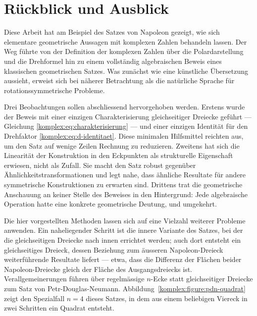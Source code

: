 %
%
\section{Rückblick und Ausblick
\label{komplex:section:rueckblick}}
Diese Arbeit hat am Beispiel des Satzes von Napoleon gezeigt,
wie sich elementare geometrische Aussagen mit komplexen Zahlen behandeln
lassen.
Der Weg führte von der Definition der komplexen Zahlen über die
Polardarstellung und die Drehformel hin zu einem vollständig algebraischen
Beweis eines klassischen geometrischen Satzes.
Was zunächst wie eine künstliche Übersetzung aussieht,
erweist sich bei näherer Betrachtung als die natürliche Sprache für
rotationssymmetrische Probleme.



Drei Beobachtungen sollen abschliessend hervorgehoben werden.
Erstens wurde der Beweis mit einer einzigen Charakterisierung
gleichseitiger Dreiecke geführt --- Gleichung
\eqref{komplex:eq:charakterisierung} --- und einer einzigen Identität
für den Drehfaktor \eqref{komplex:eq:d-identitaet}.
Diese minimalen Hilfsmittel reichten aus,
um den Satz auf wenige Zeilen Rechnung zu reduzieren.
Zweitens hat sich die Linearität der Konstruktion in den Eckpunkten
als strukturelle Eigenschaft erwiesen, nicht als Zufall.
Sie macht den Satz robust gegenüber Ähnlichkeitstransformationen
und legt nahe, dass ähnliche Resultate für andere symmetrische
Konstruktionen zu erwarten sind.
Drittens trat die geometrische Anschauung an keiner Stelle des Beweises
in den Hintergrund:
Jede algebraische Operation hatte eine konkrete geometrische Deutung,
und umgekehrt.

Die hier vorgestellten Methoden lassen sich auf eine Vielzahl weiterer
Probleme anwenden.
Ein naheliegender Schritt ist die innere Variante des Satzes,
bei der die gleichseitigen Dreiecke nach innen errichtet werden;
auch dort entsteht ein gleichseitiges Dreieck,
dessen Beziehung zum äusseren Napoleon-Dreieck weiterführende Resultate
liefert --- etwa, dass die Differenz der Flächen beider Napoleon-Dreiecke
gleich der Fläche des Ausgangsdreiecks ist.
Verallgemeinerungen führen über regelmässige $n$-Ecke statt gleichseitiger
Dreiecke zum Satz von Petr-Douglas-Neumann.
%
Abbildung~\ref{komplex:figure:pdn-quadrat} zeigt den Spezialfall $n = 4$ dieses Satzes,
in dem aus einem beliebigen Viereck in zwei Schritten ein Quadrat entsteht.

